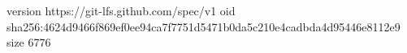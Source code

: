version https://git-lfs.github.com/spec/v1
oid sha256:4624d9466f869ef0ee94ca7f7751d5471b0da5c210e4cadbda4d95446e8112e9
size 6776
